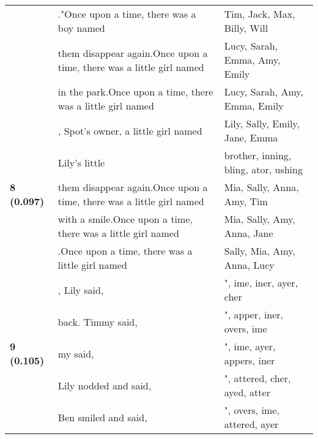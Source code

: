 \documentclass{article}
\begin{document}
\begin{adjustbox}{max width=\textwidth}
\begin{tabular}{p{} p{} p{}}
 & ."Once upon a time, there was a boy named & Tim,  Jack,  Max,  Billy,  Will \\
 & them disappear again.Once upon a time, there was a little girl named & Lucy,  Sarah,  Emma,  Amy,  Emily \\
 & in the park.Once upon a time, there was a little girl named & Lucy,  Sarah,  Amy,  Emma,  Emily \\
\midrule
\multirow{5}{*}{\textbf{8 (0.097)}} & , Spot's owner, a little girl named & Lily,  Sally,  Emily,  Jane,  Emma \\
 & Lily's little & brother, inning, bling, ator, ushing \\
 & them disappear again.Once upon a time, there was a little girl named & Mia,  Sally,  Anna,  Amy,  Tim \\
 & with a smile.Once upon a time, there was a little girl named & Mia,  Sally,  Amy,  Anna,  Jane \\
 & .Once upon a time, there was a little girl named & Sally,  Mia,  Amy,  Anna,  Lucy \\
\midrule
\multirow{5}{*}{\textbf{9 (0.105)}} & , Lily said, & ", ime, iner, ayer, cher \\
 & back. Timmy said, & ", apper, iner, overs, ime \\
 & my said, & ", ime, ayer, appers, iner \\
 & Lily nodded and said, & ", attered, cher, ayed, atter \\
 & Ben smiled and said, & ", overs, ime, attered, ayer \\
\midrule

\bottomrule
\end{tabular}
\end{adjustbox}
\end{document}
